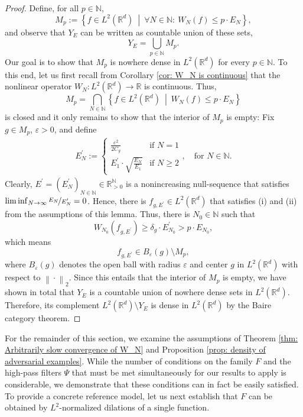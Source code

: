 \documentclass[11pt]{amsart}
\newcommand{\R}{{\mathbb{R}}}
\newcommand{\N}{\mathbb{N}}
\newcommand{\norm}[1]{\ensuremath{\left\lVert\text{}#1\text{}\right\rVert}}
\newenvironment{proof sketch} {\textit{Proof sketch.}}{}
\begin{document}
  \begin{proof} 
    Define, for all $p \in \N$,
    \[M_p:=\left\{f \in L^2(\R^d) ~\middle|~ \forall N \in \N:~W_N(f) \leq p \cdot E_N\right\},\] 
    and observe that $Y_E$ can be written as countable union of these sets,
    \[Y_E=\bigcup_{p \in \N} M_p.\] Our goal is to show that $M_p$ is nowhere dense in $L^2(\R^d)$ for every $p \in \N$. To this end, let us first recall from Corollary \ref{cor: W_N is continuous} that the nonlinear operator $W_N:L^2(\R^d) \to \R$ is continuous. Thus,
    \[M_p=\bigcap_{N \in \N} \left\{f \in L^2(\R^d) ~\middle|~ W_N(f) \leq p \cdot E_N\right\}\] is closed and it only remains to show that the interior of $M_p$ is empty: 
    Fix $g \in M_p$, $\varepsilon >0$, and define
    \begin{align*}
      E_N^\prime:=
      \begin{cases}
        \frac{\varepsilon^2}{2C_g} &\text{if } N=1\\
        E_1^\prime \cdot \sqrt{\frac{E_N}{E_1}} &\text{if } N \geq 2
      \end{cases}, \quad \text{for } N \in \N.
    \end{align*}
    Clearly, $E^\prime=(E_N^\prime)_{N \in \N}\in \R_{>0}^{\N}$ is a nonincreasing null-sequence that satisfies $\liminf_{N \to \infty} \nicefrac{E_N}{E_N^\prime}=0$. Hence, there is $f_{g,E^\prime}\in L^2(\R^d)$ that satisfies (i) and (ii) from the assumptions of this lemma.
    Thus, there is $N_0 \in \N$ such that 
    \[W_{N_0}(f_{g,E^\prime})\geq\delta_g \cdot E_{N_0}^\prime> p \cdot E_{N_0},\] which means \[f_{g,E^\prime}\in B_{\varepsilon}(g)\setminus M_p,\] 
    where $B_{\varepsilon}(g)$ denotes the open ball with radius $\varepsilon$ and center $g$ in $L^2(\R^d)$ with respect to $\norm{\cdot}_{2}$.
    Since this entails that the interior of $M_p$ is empty, we have shown in total that $Y_E$ is a countable union of nowhere dense sets in $L^2(\R^d)$. Therefore, its complement $L^2(\R^d) \setminus Y_E$ 
    is dense in $L^2(\R^d)$ by the Baire category theorem.
  \end{proof}
  
  For the remainder of this section, we examine the assumptions of Theorem \ref{thm: Arbitrarily slow convergence of W_N} and Proposition \ref{prop: density of adversarial examples}. While the number of conditions on the family $F$ and the high-pass filters $\Psi$ that must be met simultaneously for our results to apply is considerable, we demonstrate that these conditions can in fact be easily satisfied. To provide a concrete reference model, let us next establish that $F$ can be obtained by $L^2$-normalized dilations of a single function.
  
\end{document}
